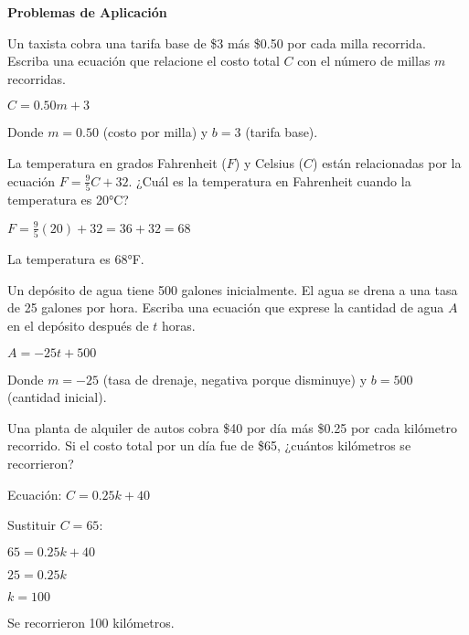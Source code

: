 \begin{exercise}
\textbf{Problemas de Aplicación}

\problem Un taxista cobra una tarifa base de \$3 más \$0.50 por cada milla recorrida. Escriba una ecuación que relacione el costo total $C$ con el número de millas $m$ recorridas.

\begin{solucion}
$C = 0.50m + 3$

Donde $m = 0.50$ (costo por milla) y $b = 3$ (tarifa base).
\end{solucion}

\problem La temperatura en grados Fahrenheit ($F$) y Celsius ($C$) están relacionadas por la ecuación $F = \frac{9}{5}C + 32$. ¿Cuál es la temperatura en Fahrenheit cuando la temperatura es 20°C?

\begin{solucion}
$F = \frac{9}{5}(20) + 32 = 36 + 32 = 68$

La temperatura es 68°F.
\end{solucion}

\problem Un depósito de agua tiene 500 galones inicialmente. El agua se drena a una tasa de 25 galones por hora. Escriba una ecuación que exprese la cantidad de agua $A$ en el depósito después de $t$ horas.

\begin{solucion}
$A = -25t + 500$

Donde $m = -25$ (tasa de drenaje, negativa porque disminuye) y $b = 500$ (cantidad inicial).
\end{solucion}

\problem Una planta de alquiler de autos cobra \$40 por día más \$0.25 por cada kilómetro recorrido. Si el costo total por un día fue de \$65, ¿cuántos kilómetros se recorrieron?

\begin{solucion}
Ecuación: $C = 0.25k + 40$

Sustituir $C = 65$:

$65 = 0.25k + 40$

$25 = 0.25k$

$k = 100$

Se recorrieron 100 kilómetros.
\end{solucion}
\end{exercise}
